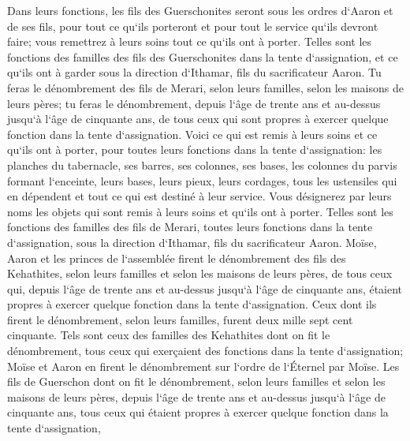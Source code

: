 \verse Dans leurs fonctions, les fils des Guerschonites seront sous les ordres d`Aaron et de ses fils, pour tout ce qu`ils porteront et pour tout le service qu`ils devront faire; vous remettrez à leurs soins tout ce qu`ils ont à porter. 
\verse Telles sont les fonctions des familles des fils des Guerschonites dans la tente d`assignation, et ce qu`ils ont à garder sous la direction d`Ithamar, fils du sacrificateur Aaron. 
\verse Tu feras le dénombrement des fils de Merari, selon leurs familles, selon les maisons de leurs pères; 
\verse tu feras le dénombrement, depuis l`âge de trente ans et au-dessus jusqu`à l`âge de cinquante ans, de tous ceux qui sont propres à exercer quelque fonction dans la tente d`assignation. 
\verse Voici ce qui est remis à leurs soins et ce qu`ils ont à porter, pour toutes leurs fonctions dans la tente d`assignation: les planches du tabernacle, ses barres, ses colonnes, ses bases, 
\verse les colonnes du parvis formant l`enceinte, leurs bases, leurs pieux, leurs cordages, tous les ustensiles qui en dépendent et tout ce qui est destiné à leur service. Vous désignerez par leurs noms les objets qui sont remis à leurs soins et qu`ils ont à porter. 
\verse Telles sont les fonctions des familles des fils de Merari, toutes leurs fonctions dans la tente d`assignation, sous la direction d`Ithamar, fils du sacrificateur Aaron. 
\verse Moïse, Aaron et les princes de l`assemblée firent le dénombrement des fils des Kehathites, selon leurs familles et selon les maisons de leurs pères, 
\verse de tous ceux qui, depuis l`âge de trente ans et au-dessus jusqu`à l`âge de cinquante ans, étaient propres à exercer quelque fonction dans la tente d`assignation. 
\verse Ceux dont ils firent le dénombrement, selon leurs familles, furent deux mille sept cent cinquante. 
\verse Tels sont ceux des familles des Kehathites dont on fit le dénombrement, tous ceux qui exerçaient des fonctions dans la tente d`assignation; Moïse et Aaron en firent le dénombrement sur l`ordre de l`Éternel par Moïse. 
\verse Les fils de Guerschon dont on fit le dénombrement, selon leurs familles et selon les maisons de leurs pères, 
\verse depuis l`âge de trente ans et au-dessus jusqu`à l`âge de cinquante ans, tous ceux qui étaient propres à exercer quelque fonction dans la tente d`assignation, 
